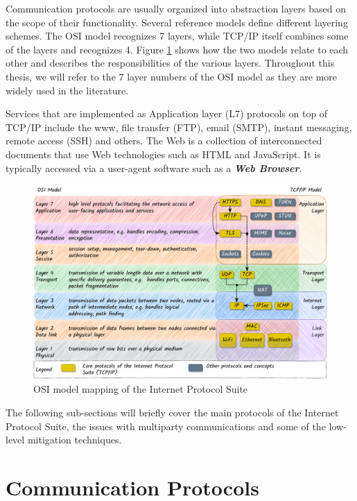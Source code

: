 Communication protocols are usually organized into abstraction layers
based on the scope of their functionality. Several reference models
define different layering schemes. The OSI model recognizes 7 layers,
while TCP/IP itself combines some of the layers and recognizes 4. Figure
\ref{osi-map-tcp} shows how the two models relate to each other and
describes the responsibilities of the various layers. Throughout this
thesis, we will refer to the 7 layer numbers of the OSI model as they
are more widely used in the literature.

Services that are implemented as Application layer (L7) protocols on top
of TCP/IP include the \gls{www}, file transfer (FTP), email (SMTP),
instant messaging, remote access (SSH\autocite{sshRFC}) and others. The
Web is a collection of interconnected documents that use Web
technologies such as HTML and JavaScript. It is typically accessed via a
user-agent software such as a \textbf{\emph{Web Browser}}.

\begin{figure}
\centering
\includegraphics[width=1\textwidth,height=\textheight]{thesis/../figures/osi-map-tcp.drawio.pdf}
\caption{OSI model mapping of the Internet Protocol
Suite\label{osi-map-tcp}}
\end{figure}

The following sub-sections will briefly cover the main protocols of the
Internet Protocol Suite, the issues with multiparty communications and
some of the low-level mitigation techniques.


\hypertarget{communication-protocols}{%
\section{Communication Protocols}\label{communication-protocols}}

